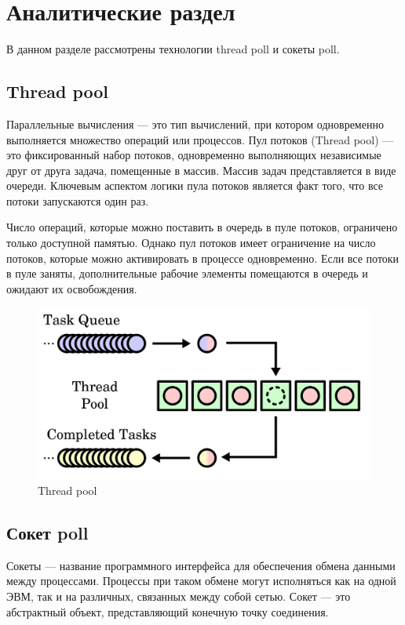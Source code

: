 \section{\large Аналитические раздел}

В данном разделе рассмотрены технологии thread poll и сокеты poll.

\subsection{Thread pool}

Параллельные вычисления --- это тип вычислений, при котором одновременно выполняется множество операций или процессов.
Пул потоков (Thread pool) \cite{ThreadPools} --- это фиксированный набор потоков, одновременно выполняющих независимые друг от друга задача,
помещенные в массив.
Массив задач представляется в виде очереди.
Ключевым аспектом логики пула потоков является факт того, что все потоки запускаются один раз.

Число операций, которые можно поставить в очередь в пуле потоков, ограничено только доступной памятью.
Однако пул потоков имеет ограничение на число потоков, которые можно активировать в процессе одновременно.
Если все потоки в пуле заняты, дополнительные рабочие элементы помещаются в очередь и ожидают их освобождения.

\begin{figure}[ht!]
	\centering
	\includegraphics[width=0.7\linewidth]{assets/images/1200px-Thread_pool.svg.png}
	\caption{Thread pool}
	\label{aaa:anal}
\end{figure}
\FloatBarrier

\subsection{Сокет poll}

Сокеты --- название программного интерфейса для обеспечения обмена данными между процессами.
Процессы при таком обмене могут исполняться как на одной ЭВМ, так и на различных, связанных между собой сетью.
Сокет --- это абстрактный объект, представляющий конечную точку соединения.

